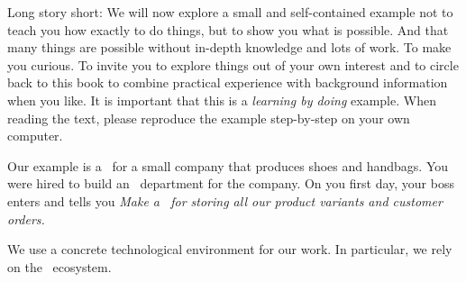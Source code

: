 Long story short:
We will now explore a small and self-contained example not to teach you how exactly to do things, but to show you what is possible.
And that many things are possible without in-depth knowledge and lots of work.
To make you curious.
To invite you to explore things out of your own interest and to circle back to this book to combine practical experience with background information when you like.
It is important that this is a \emph{learning by doing} example.
When reading the text, please reproduce the example step-by-step on your own computer.

Our example is a \dbs\ for a small company that produces shoes and handbags.
You were hired to build an ~department for the company.
On you first day, your boss enters and tells you \emph{Make a \db\ for storing all our product variants and customer orders.}

We use a concrete technological environment for our work.
In particular, we rely on the \postgresql\ ecosystem.%
%
%
%
